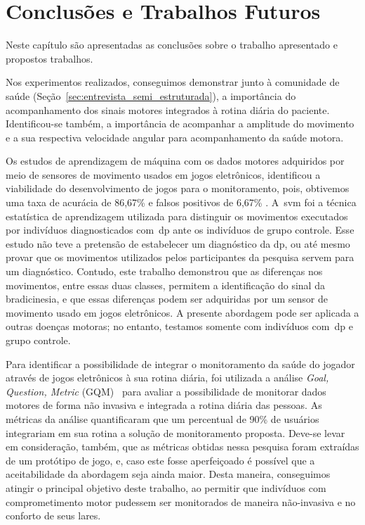 \chapter{Conclusões e Trabalhos Futuros}\label{chapter:conclusoes_futuros}
Neste capítulo são apresentadas as conclusões sobre o trabalho apresentado e propostos trabalhos.  


Nos experimentos realizados, conseguimos demonstrar junto à comunidade de saúde (Seção~\ref{sec:entrevista_semi_estruturada}), a importância do acompanhamento dos sinais motores integrados à rotina diária do paciente. Identificou-se também, a importância de acompanhar a amplitude do movimento e a sua respectiva velocidade angular para acompanhamento da saúde motora.

Os estudos de aprendizagem de máquina com os dados motores adquiridos por meio de sensores de movimento usados em jogos eletrônicos, identificou a viabilidade do desenvolvimento de jogos para o monitoramento, pois, obtivemos uma taxa de acurácia de 86,67\% e falsos positivos de 6,67\% . A~\ac{svm} foi a técnica estatística de aprendizagem utilizada para distinguir os movimentos executados por indivíduos diagnosticados com~\ac{dp} ante os indivíduos de grupo controle. Esse estudo não teve a pretensão de estabelecer um diagnóstico da \ac{dp}, ou até mesmo provar que os movimentos utilizados pelos participantes da pesquisa servem para um diagnóstico. Contudo, este trabalho demonstrou que as diferenças nos movimentos, entre essas duas classes, permitem a identificação do sinal da bradicinesia, e que essas diferenças podem ser adquiridas por um sensor de movimento usado em jogos eletrônicos. A presente abordagem pode ser aplicada a outras doenças motoras; no entanto, testamos somente com indivíduos com~\ac{dp} e grupo controle.

Para identificar a possibilidade de integrar o monitoramento da saúde do jogador através de jogos eletrônicos à sua rotina diária, foi utilizada a análise \textit{Goal, Question, Metric} (GQM)~\cite{basili94} para avaliar a possibilidade de monitorar dados motores de forma não invasiva e integrada a rotina diária das pessoas. As métricas da análise quantificaram que um percentual de 90\% de usuários integrariam em sua rotina a solução de monitoramento proposta. Deve-se levar em consideração, também, que as métricas obtidas nessa pesquisa foram extraídas de um protótipo de jogo, e, caso este fosse aperfeiçoado é possível que a aceitabilidade da abordagem seja ainda maior. Desta maneira, conseguimos atingir o principal objetivo deste trabalho, ao permitir que indivíduos com comprometimento motor pudessem ser monitorados de maneira não-invasiva e no conforto de seus lares.




